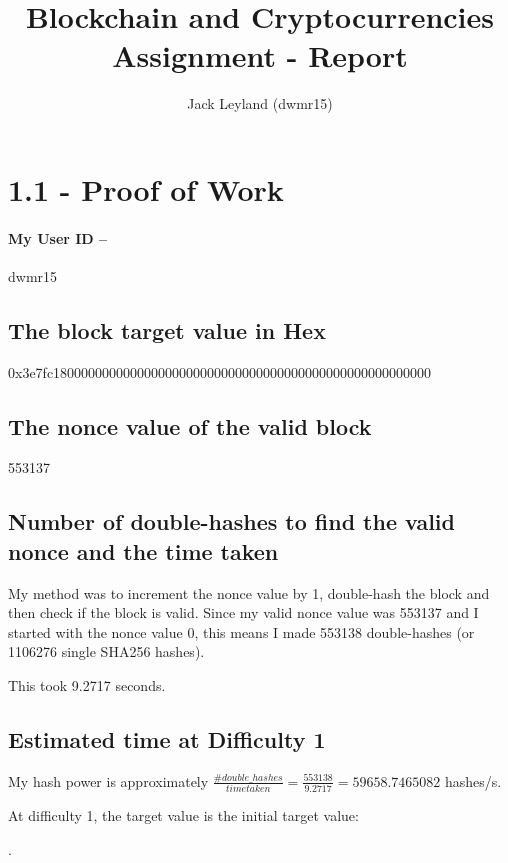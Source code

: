\documentclass[11pt]{article}
\begin{document}
	
	\title{Blockchain and Cryptocurrencies Assignment - Report}
	\author{Jack Leyland (dwmr15)}
	
	\maketitle
	
	\section*{1.1 - Proof of Work}
	\paragraph*{My User ID -- } dwmr15
	
	\subsection*{The block target value in Hex}
	0x3e7fc180000000000000000000000000000000000000000000000000000
	
	\subsection*{The nonce value of the valid block}
	553137
	
	\subsection*{Number of double-hashes to find the valid nonce and the time taken}
	My method was to increment the nonce value by 1, double-hash the block and then check if the block is valid. Since my valid nonce value was 553137 and I started with the nonce value 0, this means I made 553138 double-hashes (or 1106276 single SHA256 hashes). 
	
	This took 9.2717 seconds.
	
	\subsection*{Estimated time at Difficulty 1}
	My hash power is approximately $\frac{\#double\_hashes}{time taken} = \frac{553138}{9.2717} = 59658.7465082$ hashes/s. \newline
	
	At difficulty 1, the target value is the initial target value: 
	
	. \newline 
	
\end{document}
